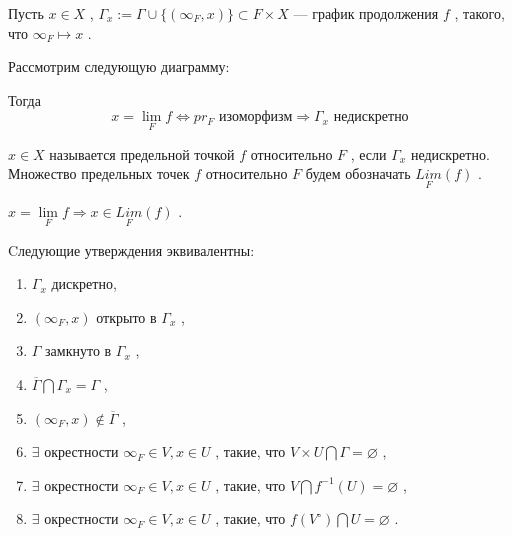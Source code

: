 Пусть \( x \in X \) , \( \Gamma_x := \Gamma \cup \{ (\infty_F,x) \} \subset F \times X \) --- график продолжения \( f \) , такого, что \( \infty_F \mapsto x \) .
\vspace
{}

\SSsect Рассмотрим следующую диаграмму:


Тогда
\[ x = \lim_{F} f \Leftrightarrow pr_F \mbox{~изоморфизм} \Rightarrow \Gamma_x \mbox{~недискретно} \]

\SSsect[def] \( x \in X \) называется предельной точкой \( f \) относительно \( F \) , если \( \Gamma_x \) недискретно. Множество предельных точек \( f \) относительно \( F \) будем обозначать \( \underset{F}{Lim}(f) \) .

\SSsect \( x = \lim\limits_{F} f \Rightarrow x \in \underset{F}{Lim}(f) \) .

\pagebreak

\SSsect Cледующие утверждения эквивалентны:

\begin{enumerate}[label={\alph*)}]
\item \( \Gamma_x \) дискретно, 
\item \( (\infty_F,x) \) открыто в \( \Gamma_x \) ,
\item \( \Gamma \) замкнуто в \( \Gamma_x \) ,
\item \( \overline{\Gamma} \bigcap \Gamma_x = \Gamma \) , 
\item \( (\infty_F,x) \notin \overline{\Gamma} \) , 
\item \( \exists \) окрестности \( \infty_F \in V, x \in U\) , такие, что \( V \times U \bigcap \Gamma = \varnothing \) ,
\item \( \exists \) окрестности \( \infty_F \in V, x \in U\) , такие, что \( V \bigcap f^{-1}(U) = \varnothing \) , 
\item \( \exists \) окрестности \( \infty_F \in V, x \in U\) , такие, что \( f(V^{\circ}) \bigcap U = \varnothing \) . 
\end{enumerate}

